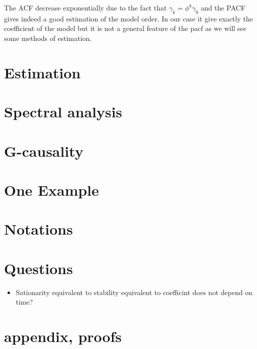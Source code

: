\documentclass{article}
\theoremstyle{definition}
\begin{document}
The ACF decrease exponentially due to the fact that $\gamma_k=\phi^k\gamma_0$ and the PACF gives indeed a good estimation of the model order. In our case it give exactly the coefficient of the model but it is not a general feature of the pacf as we will see some methods of estimation.
\section{Estimation}
\section{Spectral analysis}
\section{G-causality}
\section{One Example}
\section{Notations}
\section{Questions}
\begin{itemize}
\item Sationarity equivalent to stability equivalent to coefficint does not depend on time?
\end{itemize}
\section{appendix, proofs}
\end{document}
